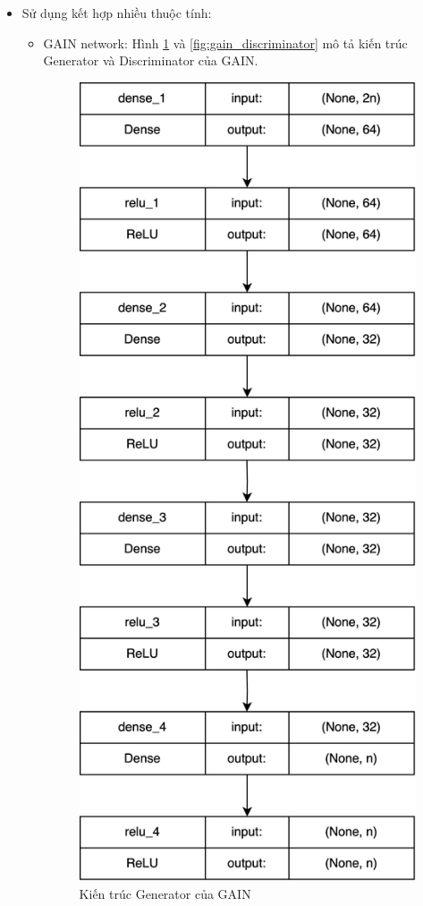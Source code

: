\begin{itemize}
\begin{itemize}
\begin{itemize}
                \end{itemize}
            \item Sử dụng kết hợp nhiều thuộc tính:
                \begin{itemize}
                    \item GAIN network: Hình \ref{fig:gain_generator} và  \ref{fig:gain_discriminator} mô tả kiến trúc Generator và Discriminator của GAIN.
                    \begin{figure}[h!]
                        \centering
                        \includegraphics[width=0.5\linewidth]{image/section5_3/gain-generator.drawio.png}
                        \caption{Kiến trúc Generator của GAIN}
                        \label{fig:gain_generator}
                    \end{figure}

                    \newpage
                    

\end{itemize}
\end{itemize}
\end{itemize}
